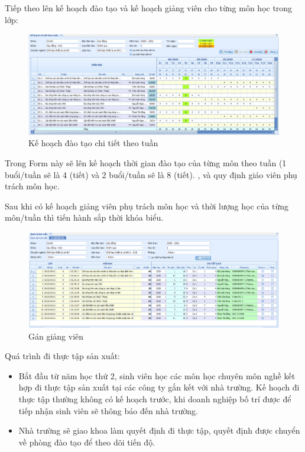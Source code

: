 \documentclass[11pt]{article}
\begin{document}
Tiếp theo lên kế hoạch đào tạo và kế hoạch giảng viên  cho từng môn học trong lớp:

\begin{figure}[h!]
\begin{center}
\includegraphics[width=17cm]{CurrentProcess3.png}
\caption{Kế hoạch đào tạo chi tiết theo tuần}
\end{center}
\end{figure}

Trong Form này sẽ lên kế hoạch thời gian đào tạo của từng môn theo tuần (1 buổi/tuần sẽ là 4 (tiết) và 2 buổi/tuần sẽ là 8 (tiết). , và quy định giáo viên phụ trách môn học.

Sau khi có kế hoạch giảng viên phụ trách môn học và thời lượng học của từng môn/tuần thì tiến hành sắp thời khóa biểu.

\begin{figure}[h!]
\begin{center}
\includegraphics[width=17cm]{CurrentProcess4.png}
\caption{Gán giảng viên}
\end{center}
\end{figure}


Quá trình đi thực tập sản xuất:

\begin{itemize}
\item	Bắt đầu từ năm học thứ 2, sinh viên học các môn học chuyên môn nghề kết hợp đi thực tập sản xuất tại các công ty gắn kết với nhà trường. Kế hoạch đi  thực tập thường không có kế hoạch trước, khi doanh nghiệp bố trí được để tiếp nhận sinh viên sẽ thông báo đến nhà trường. 
\item	Nhà trường sẽ giao khoa làm quyết định đi thực tập, quyết định được chuyển về phòng đào tạo để theo dõi tiến độ.
\end{itemize}
\end{document}

